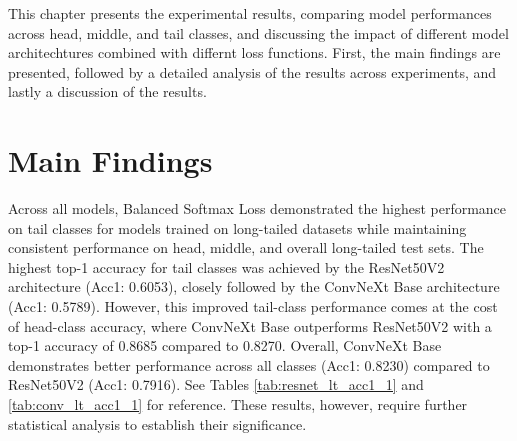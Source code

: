 This chapter presents the experimental results, comparing model performances across head, middle, and tail classes, and discussing the impact of different model architechtures combined with differnt loss functions. First, the main findings are presented, followed by a detailed analysis of the results across experiments, and lastly a discussion of the results. 


\section{Main Findings}


Across all models, Balanced Softmax Loss demonstrated the highest performance on tail classes for models trained on long-tailed datasets while maintaining consistent performance on head, middle, and overall long-tailed test sets. The highest top-1 accuracy for tail classes was achieved by the ResNet50V2 architecture (Acc1: 0.6053), closely followed by the ConvNeXt Base architecture (Acc1: 0.5789). However, this improved tail-class performance comes at the cost of head-class accuracy, where ConvNeXt Base outperforms ResNet50V2 with a top-1 accuracy of 0.8685 compared to 0.8270. Overall, ConvNeXt Base demonstrates better performance across all classes (Acc1: 0.8230) compared to ResNet50V2 (Acc1: 0.7916). See Tables \ref{tab:resnet_lt_acc1_1} and \ref{tab:conv_lt_acc1_1} for reference. These results, however, require further statistical analysis to establish their significance.



